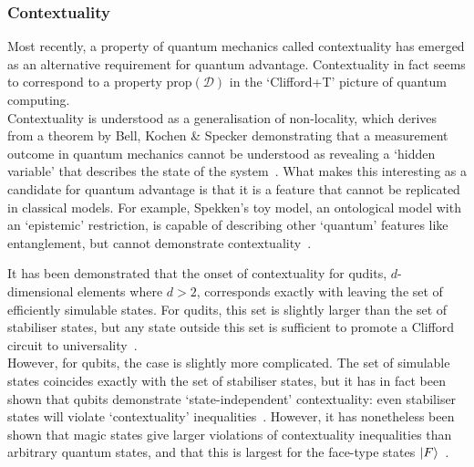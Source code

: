 \documentclass{standalone}
\begin{document}
\subsubsection{Contextuality}\label{sec:context}
Most recently, a property of quantum mechanics called contextuality has emerged as an alternative requirement for quantum advantage. Contextuality in fact seems to correspond to a property $\text{prop}\left(\mathcal{D}\right)$ in the `Clifford+T' picture of quantum computing. \\
Contextuality is understood as a generalisation of non-locality, which derives from a theorem by Bell, Kochen \& Specker demonstrating that a measurement outcome in quantum mechanics cannot be understood as revealing a `hidden variable' that describes the state of the system~\cite{Howard2014}. What makes this interesting as a candidate for quantum advantage is that it is a feature that cannot be replicated in classical models. For example, Spekken's toy model, an ontological model with an `epistemic' restriction, is capable of describing other `quantum' features like entanglement, but cannot demonstrate contextuality~\cite{Spekkens2007}. 
\par
It has been demonstrated that the onset of contextuality for qudits, $d$-dimensional elements where $d>2$, corresponds exactly with leaving the set of efficiently simulable states. For qudits, this set is slightly larger than the set of stabiliser states, but any state outside this set is sufficient to promote a Clifford circuit to universality~\cite{Howard2014}.\\
However, for qubits, the case is slightly more complicated. The set of simulable states coincides exactly with the set of stabiliser states, but it has in fact been shown that qubits demonstrate `state-independent' contextuality: even stabiliser states will violate `contextuality' inequalities~\cite{Howard2014}. However, it has nonetheless been shown that magic states give larger violations of contextuality inequalities than arbitrary quantum states, and that this is largest for the face-type states $\ket{F}$~\cite{Howard2014}.

\ifstandalone 

\fi
\end{document}

